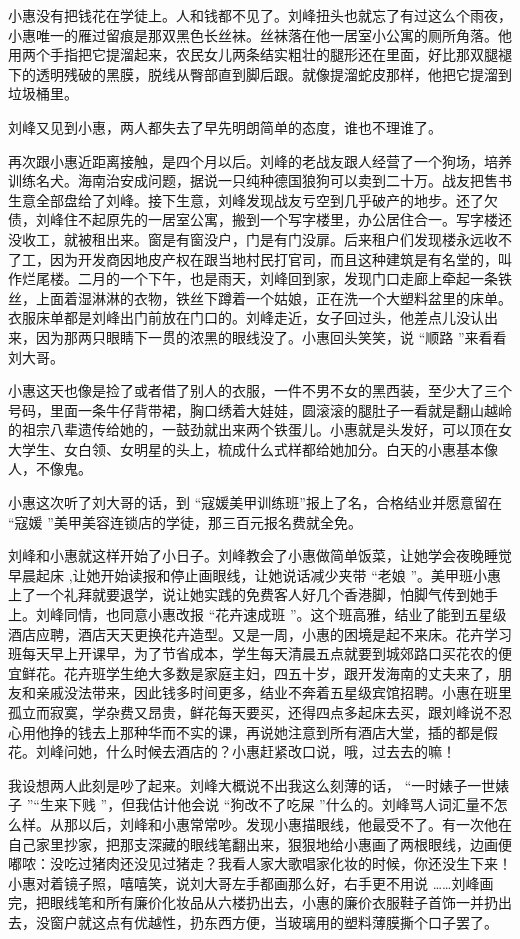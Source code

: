 \documentclass[12pt,twoside,openany]{book}
\begin{document}
小惠没有把钱花在学徒上。人和钱都不见了。刘峰扭头也就忘了有过这么个雨夜，小惠唯一的雁过留痕是那双黑色长丝袜。丝袜落在他一居室小公寓的厕所角落。他用两个手指把它提溜起来，农民女儿两条结实粗壮的腿形还在里面，好比那双腿褪下的透明残破的黑膜，脱线从臀部直到脚后跟。就像提溜蛇皮那样，他把它提溜到垃圾桶里。

刘峰又见到小惠，两人都失去了早先明朗简单的态度，谁也不理谁了。

再次跟小惠近距离接触，是四个月以后。刘峰的老战友跟人经营了一个狗场，培养训练名犬。海南治安成问题，据说一只纯种德国狼狗可以卖到二十万。战友把售书生意全部盘给了刘峰。接下生意，刘峰发现战友亏空到几乎破产的地步。还了欠债，刘峰住不起原先的一居室公寓，搬到一个写字楼里，办公居住合一。写字楼还没收工，就被租出来。窗是有窗没户，门是有门没扉。后来租户们发现楼永远收不了工，因为开发商因地皮产权在跟当地村民打官司，而且这种建筑是有名堂的，叫作烂尾楼。二月的一个下午，也是雨天，刘峰回到家，发现门口走廊上牵起一条铁丝，上面着湿淋淋的衣物，铁丝下蹲着一个姑娘，正在洗一个大塑料盆里的床单。衣服床单都是刘峰出门前放在门口的。刘峰走近，女子回过头，他差点儿没认出来，因为那两只眼睛下一贯的浓黑的眼线没了。小惠回头笑笑，说 “顺路 ”来看看刘大哥。

小惠这天也像是捡了或者借了别人的衣服，一件不男不女的黑西装，至少大了三个号码，里面一条牛仔背带裙，胸口绣着大娃娃，圆滚滚的腿肚子一看就是翻山越岭的祖宗八辈遗传给她的，一鼓劲就出来两个铁蛋儿。小惠就是头发好，可以顶在女大学生、女白领、女明星的头上，梳成什么式样都给她加分。白天的小惠基本像人，不像鬼。

小惠这次听了刘大哥的话，到 “寇媛美甲训练班”报上了名，合格结业并愿意留在 “寇媛 ”美甲美容连锁店的学徒，那三百元报名费就全免。

刘峰和小惠就这样开始了小日子。刘峰教会了小惠做简单饭菜，让她学会夜晚睡觉早晨起床 ,让她开始读报和停止画眼线，让她说话减少夹带 “老娘 ”。美甲班小惠上了一个礼拜就要退学，说让她实践的免费客人好几个香港脚，怕脚气传到她手上。刘峰同情，也同意小惠改报 “花卉速成班 ”。这个班高雅，结业了能到五星级酒店应聘，酒店天天更换花卉造型。又是一周，小惠的困境是起不来床。花卉学习班每天早上开课早，为了节省成本，学生每天清晨五点就要到城郊路口买花农的便宜鲜花。花卉班学生绝大多数是家庭主妇，四五十岁，跟开发海南的丈夫来了，朋友和亲戚没法带来，因此钱多时间更多，结业不奔着五星级宾馆招聘。小惠在班里孤立而寂寞，学杂费又昂贵，鲜花每天要买，还得四点多起床去买，跟刘峰说不忍心用他挣的钱去上那种华而不实的课，再说她注意到所有酒店大堂，插的都是假花。刘峰问她，什么时候去酒店的？小惠赶紧改口说，哦，过去去的嘛！

我设想两人此刻是吵了起来。刘峰大概说不出我这么刻薄的话， “一时婊子一世婊子 ”“生来下贱 ”，但我估计他会说 “狗改不了吃屎 ”什么的。刘峰骂人词汇量不怎么样。从那以后，刘峰和小惠常常吵。发现小惠描眼线，他最受不了。有一次他在自己家里抄家，把那支深藏的眼线笔翻出来，狠狠地给小惠画了两根眼线，边画便嘟哝：没吃过猪肉还没见过猪走？我看人家大歌唱家化妆的时候，你还没生下来！小惠对着镜子照，嘻嘻笑，说刘大哥左手都画那么好，右手更不用说 ……刘峰画完，把眼线笔和所有廉价化妆品从六楼扔出去，小惠的廉价衣服鞋子首饰一并扔出去，没窗户就这点有优越性，扔东西方便，当玻璃用的塑料薄膜撕个口子罢了。
\end{document}
